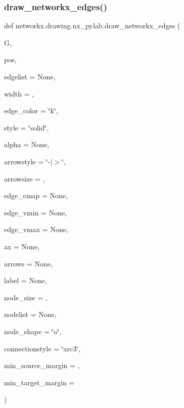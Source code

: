 \subsubsection{\texorpdfstring{draw\+\_\+networkx\+\_\+edges()}{draw\_networkx\_edges()}}
{\footnotesize\ttfamily def networkx.\+drawing.\+nx\+\_\+pylab.\+draw\+\_\+networkx\+\_\+edges (\begin{DoxyParamCaption}\item[{}]{G,  }\item[{}]{pos,  }\item[{}]{edgelist = {\ttfamily None},  }\item[{}]{width = {},  }\item[{}]{edge\+\_\+color = {\ttfamily \char`\"{}k\char`\"{}},  }\item[{}]{style = {\ttfamily \char`\"{}solid\char`\"{}},  }\item[{}]{alpha = {\ttfamily None},  }\item[{}]{arrowstyle = {\ttfamily \char`\"{}-\/$\vert$$>$\char`\"{}},  }\item[{}]{arrowsize = {},  }\item[{}]{edge\+\_\+cmap = {\ttfamily None},  }\item[{}]{edge\+\_\+vmin = {\ttfamily None},  }\item[{}]{edge\+\_\+vmax = {\ttfamily None},  }\item[{}]{ax = {\ttfamily None},  }\item[{}]{arrows = {\ttfamily None},  }\item[{}]{label = {\ttfamily None},  }\item[{}]{node\+\_\+size = {},  }\item[{}]{nodelist = {\ttfamily None},  }\item[{}]{node\+\_\+shape = {\ttfamily \char`\"{}o\char`\"{}},  }\item[{}]{connectionstyle = {\ttfamily \char`\"{}arc3\char`\"{}},  }\item[{}]{min\+\_\+source\+\_\+margin = {},  }\item[{}]{min\+\_\+target\+\_\+margin = {} }\end{DoxyParamCaption})}

